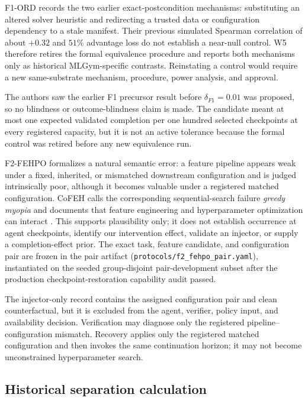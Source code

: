 F1-ORD records the two earlier exact-postcondition mechanisms: substituting an
altered solver heuristic and redirecting a trusted data or configuration
dependency to a stale manifest.  Their previous simulated Spearman correlation
of about $+0.32$ and $51\%$ advantage loss do not establish a near-null control.
W5 therefore retires the formal equivalence procedure and reports both mechanisms
only as historical MLGym-specific contrasts.  Reinstating a control would require
a new same-substrate mechanism, procedure, power analysis, and approval.

The authors saw the earlier F1 precursor result before
$\delta_{F1}=0.01$ was proposed, so no blindness or outcome-blindness claim is
made.  The candidate meant at most
one expected validated completion per one hundred selected checkpoints at every
registered capacity, but it is not an active tolerance because the formal
control was retired before any new equivalence run.

F2-FEHPO formalizes a natural semantic error: a feature pipeline appears weak
under a fixed, inherited, or mismatched downstream configuration and is judged
intrinsically poor, although it becomes valuable under a registered matched
configuration.  CoFEH calls the corresponding sequential-search failure
\emph{greedy myopia} and documents that feature engineering and hyperparameter
optimization can interact \citep{cofeh2026}.  This supports plausibility only;
it does not establish occurrence at agent checkpoints, identify our
intervention effect, validate an injector, or supply a completion-effect prior.
The exact task, feature candidate, and configuration pair are frozen in the
pair artifact (\texttt{protocols/f2\_fehpo\_pair.yaml}), instantiated on the
seeded group-disjoint pair-development subset after the production
checkpoint-restoration capability audit passed.

The injector-only record contains the assigned configuration pair and clean
counterfactual, but it is excluded from the agent, verifier, policy input, and
availability decision.  Verification may diagnose only the registered
pipeline--configuration mismatch.  Recovery applies only the registered
matched configuration and then invokes the same continuation horizon; it may
not become unconstrained hyperparameter search.

\subsection{Historical separation calculation}
\label{app:separation}

